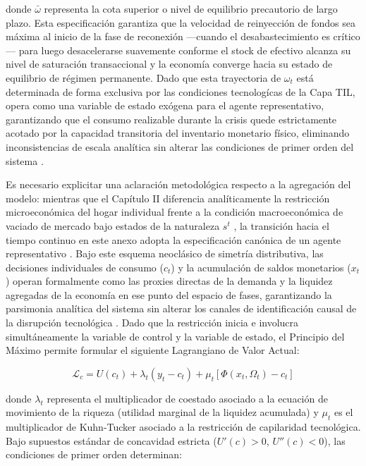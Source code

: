 donde $\bar{\omega}$ representa la cota superior o nivel de equilibrio precautorio de largo plazo. Esta especificaci\'on garantiza que la velocidad de reinyecci\'on de fondos sea m\'axima al inicio de la fase de reconexi\'on ---cuando el desabastecimiento es cr\'itico--- para luego desacelerarse suavemente conforme el stock de efectivo alcanza su nivel de saturaci\'on transaccional y la econom\'ia converge hacia su estado de equilibrio de r\'egimen permanente. Dado que esta trayectoria de $\omega_t$ est\'a determinada de forma exclusiva por las condiciones tecnolog\'icas de la Capa TIL, opera como una variable de estado ex\'ogena para el agente representativo, garantizando que el consumo realizable durante la crisis quede estrictamente acotado por la capacidad transitoria del inventario monetario f\'isico, eliminando inconsistencias de escala anal\'itica sin alterar las condiciones de primer orden del sistema \citep{crouzet2023shocks}.

Es necesario explicitar una aclaraci\'on metodol\'ogica respecto a la agregaci\'on del modelo: mientras que el Cap\'itulo II diferencia anal\'iticamente la restricci\'on microecon\'omica del hogar individual frente a la condici\'on macroecon\'omica de vaciado de mercado bajo estados de la naturaleza $s^t$ \citep{woodford2003interest}, la transici\'on hacia el tiempo continuo en este anexo adopta la especificaci\'on can\'onica de un agente representativo \citep{lucas1987money}. Bajo este esquema neocl\'asico de simetr\'ia distributiva, las decisiones individuales de consumo ($c_t$) y la acumulaci\'on de saldos monetarios ($x_t$) operan formalmente como las proxies directas de la demanda y la liquidez agregadas de la econom\'ia en ese punto del espacio de fases, garantizando la parsimonia anal\'itica del sistema sin alterar los canales de identificaci\'on causal de la disrupci\'on tecnol\'ogica \citep{alvarez2009financial}. Dado que la restricci\'on inicia e involucra simult\'aneamente la variable de control y la variable de estado, el Principio del M\'aximo permite formular el siguiente Lagrangiano de Valor Actual:

\begin{equation}
\mathcal{L}_c = U(c_t) + \lambda_t(y_t-c_t) + \mu_t[\Phi(x_t,\Omega_t)-c_t]
\end{equation}

donde $\lambda_t$ representa el multiplicador de coestado asociado a la ecuaci\'on de movimiento de la riqueza (utilidad marginal de la liquidez acumulada) y $\mu_t$ es el multiplicador de Kuhn-Tucker asociado a la restricci\'on de capilaridad tecnol\'ogica. Bajo supuestos est\'andar de concavidad estricta ($U'(c)>0$, $U''(c)<0$), las condiciones de primer orden determinan:

